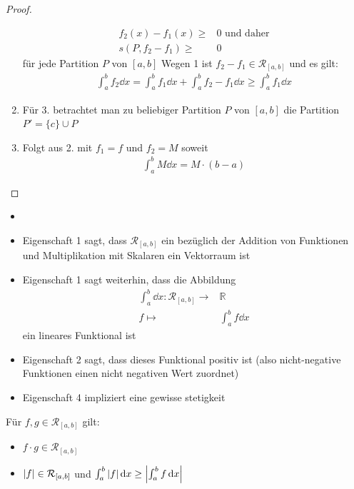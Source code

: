 \begin{proof}
\begin{enumerate}
		\begin{align*}		
			f_2(x) - f_1(x) \geq & 0 \text{ und daher} \\
			s(P, f_2 -f_1) \geq & 0
		\end{align*} 
		 für jede Partition $P$ von $[a,b]$ 
		Wegen 1 ist $f_2 -f_1 \in \mathcal{R}_{[a,b]}$ und es gilt:
		\begin{align*}
			\int_a^b f_2 \dd{x} = \int_a^b f_1 \dd{x} + \int_a^bf_2-f_1 \dd{x} 
			\geq \int_a^b f_1 \dd{x}
	\end{align*}		 
	\item Für 3. betrachtet man zu beliebiger Partition $P$ von $[a,b]$ die Partition \linebreak
	$P' = \{c\} \cup P$
	\item Folgt aus 2. mit $f_1 = f$ und $f_2 = M$ soweit 
	\begin{align*}
		\int_a^b M \dd{x} = M \cdot (b-a)
	\end{align*}		
	\end{enumerate}
\end{proof}

\begin{Bemerkung}{
	\begin{itemize}
	 	\item[ ]
		\item Eigenschaft 1 sagt, dass $\mathcal{R}_{[a,b]}$ ein bezüglich der Addition von 
		Funktionen und Multiplikation mit Skalaren ein Vektorraum ist
		\item Eigenschaft 1 sagt weiterhin, dass die Abbildung 
		\begin{align*}
			\int_a^b \dd{x} : \mathcal{R}_{[a,b]} \rightarrow  & \mathbb{R} \\
			f \mapsto & \int_a^b f\dd{x}
		\end{align*}
		ein lineares Funktional ist
		\item Eigenschaft 2 sagt, dass dieses Funktional positiv ist
		(also nicht-negative Funktionen einen nicht negativen Wert zuordnet)
		\item Eigenschaft 4 impliziert eine gewisse stetigkeit
	\end{itemize}
}\end{Bemerkung}

\begin{Satz}{
	Für $f,g \in \mathcal{R}_{[a,b]}$ gilt:
	\begin{itemize}
		\item $f \cdot g \in \mathcal{R}_{[a,b]}$
		\item $\abs{f} \in \mathcal{R}_{[a,b]}$ und $\int_a^b \abs{f} \dd{x} 
		\geq \abs{\int_a^b f \dd{x}}$
	\end{itemize}
}\end{Satz}

